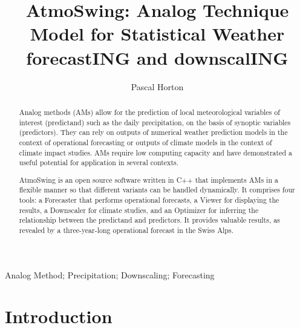 \documentclass[review]{elsarticle}
\begin{document}
	
\begin{frontmatter}
	
	\title{AtmoSwing: Analog Technique Model for Statistical Weather forecastING and downscalING}
	
	
	\author[unibe,unil,terranum]{Pascal Horton}
	
	
	\address[unibe]{University of Bern, Oeschger Centre for Climate Change Research, Institute of Geography, Bern, Switzerland}
	\address[unil]{University of Lausanne, Institute of Earth Sciences, Lausanne, Switzerland}
	\address[terranum]{Terranum SARL, Bussigny, Switzerland}
	
	
	
	\begin{abstract}
		Analog methods (AMs) allow for the prediction of local meteorological variables of interest (predictand) such as the daily precipitation, on the basis of synoptic variables (predictors). They can rely on outputs of numerical weather prediction models in the context of operational forecasting or outputs of climate models in the context of climate impact studies. AMs require low computing capacity and have demonstrated a useful potential for application in several contexts. 
		
		AtmoSwing is an open source software written in C++ that implements AMs in a flexible manner so that different variants can be handled dynamically. It comprises four tools: a Forecaster that performs operational forecasts, a Viewer for displaying the results, a Downscaler for climate studies, and an Optimizer for inferring the relationship between the predictand and predictors. It provides valuable results, as revealed by a three-year-long operational forecast in the Swiss Alps. 
	\end{abstract}
	
	\begin{keyword}
		Analog Method; Precipitation; Downscaling; Forecasting
	\end{keyword}
	
\end{frontmatter}

\linenumbers


\section{Introduction}
\end{document}
